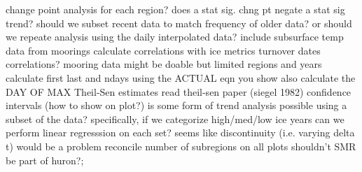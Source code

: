 \markdownRendererDocumentBegin
\markdownRendererUlBegin
\markdownRendererUlItem change point analysis for each region?\markdownRendererInterblockSeparator
{}\markdownRendererUlBeginTight
\markdownRendererUlItem does a stat sig. chng pt negate a stat sig trend?\markdownRendererUlItemEnd 
\markdownRendererUlEndTight \markdownRendererUlItemEnd 
\markdownRendererUlItem should we subset recent data to match frequency of older data? or should we repeate analysis using the daily interpolated data?\markdownRendererUlItemEnd 
\markdownRendererUlItem include subsurface temp data from moorings\markdownRendererInterblockSeparator
{}\markdownRendererUlBeginTight
\markdownRendererUlItem calculate correlations with ice metrics\markdownRendererUlItemEnd 
\markdownRendererUlItem turnover dates correlations?\markdownRendererUlItemEnd 
\markdownRendererUlEndTight \markdownRendererUlItemEnd 
\markdownRendererUlItem mooring data might be doable but limited regions and years\markdownRendererUlItemEnd 
\markdownRendererUlItem calculate first last and ndays using the ACTUAL eqn you show\markdownRendererUlItemEnd 
\markdownRendererUlItem also calculate the DAY OF MAX\markdownRendererUlItemEnd 
\markdownRendererUlItem Theil-Sen estimates\markdownRendererUlItemEnd 
\markdownRendererUlItem read theil-sen paper (siegel 1982)\markdownRendererUlItemEnd 
\markdownRendererUlItem confidence intervals (how to show on plot?)\markdownRendererUlItemEnd 
\markdownRendererUlItem is some form of trend analysis possible using a subset of the data?\markdownRendererInterblockSeparator
{}\markdownRendererUlBeginTight
\markdownRendererUlItem specifically, if we categorize high/med/low ice years can we perform linear regresssion on each set?\markdownRendererUlItemEnd 
\markdownRendererUlItem seems like discontinuity (i.e. varying delta t) would be a problem\markdownRendererUlItemEnd 
\markdownRendererUlEndTight \markdownRendererUlItemEnd 
\markdownRendererUlItem reconcile number of subregions on all plots\markdownRendererInterblockSeparator
{}\markdownRendererUlBeginTight
\markdownRendererUlItem shouldn't SMR be part of huron?;\markdownRendererUlItemEnd 
\markdownRendererUlEndTight \markdownRendererUlItemEnd 
\markdownRendererUlEnd \markdownRendererDocumentEnd